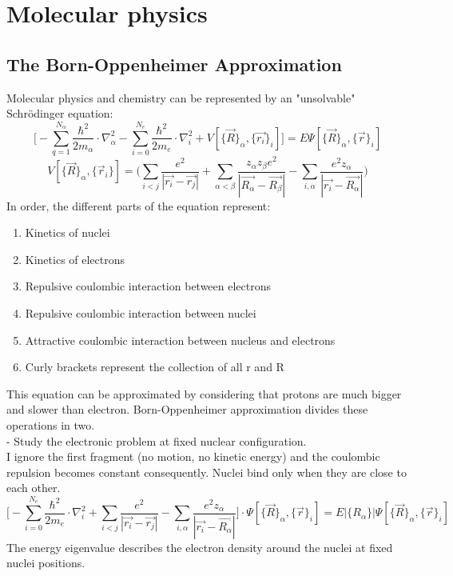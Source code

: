 \graphicspath{{chapters/07/}}
\chapter{Molecular physics}
\section{The Born-Oppenheimer Approximation}
Molecular physics and chemistry can be represented by an "unsolvable" Schr\"odinger equation:\\
\[
\bigg[-\sum_{q=1}^{N_{\alpha}}\frac{\hbar^2}{2m_{\alpha}}\cdot\nabla_{\alpha}^2
-\sum_{i=0}^{N_e}\frac{\hbar^2}{2m_e}\cdot\nabla^2_i
+V[\{\vec{R}\}_{\alpha},\{\vec{r_i}\}_i]\bigg]=E\Psi[\{\vec{R}\}_{\alpha},\{\vec{r}\}_i]
\]
\[
V[\{\vec{R}\}_{\alpha},\{\vec{r}_i\}]=\bigg(\sum_{i<j}\frac{e^2}{|\vec{r_i}-\vec{r_j}|}
+\sum_{\alpha<\beta}\frac{z_{\alpha}z_{\beta}e^2}{|\vec{R_{\alpha}}-\vec{R_{\beta}}|}
-\sum_{i,\alpha}\frac{e^2z_{\alpha}}{|\vec{r_i}-\vec{R_{\alpha}}|}\bigg)\]
In order, the different parts of the equation represent:
\begin{enumerate}
	\item Kinetics of nuclei
	\item Kinetics of electrons
	\item Repulsive coulombic interaction between electrons
	\item Repulsive coulombic interaction between nuclei
	\item Attractive coulombic interaction between nucleus and electrons
	\item Curly brackets represent the collection of all r and R
\end{enumerate}
This equation can be approximated by considering that protons are much bigger and slower than electron. Born-Oppenheimer approximation divides these operations in two.\\
 - Study the electronic problem at fixed nuclear configuration.\\
I ignore the first fragment (no motion, no kinetic energy) and the coulombic repulsion becomes constant consequently. Nuclei bind only when they are close to each other.
\[
\bigg[-\sum_{i=0}^{N_e}\frac{\hbar^2}{2m_e}\cdot\nabla^2_i
+\sum_{i<j}\frac{e^2}{|\vec{r_i}-\vec{r_j}|}
-\sum_{i,\alpha}\frac{e^2z_{\alpha}}{|\vec{r_i}-\vec{R_{\alpha}}|}\bigg]\cdot\Psi[\{\vec{R}\}_{\alpha},\{\vec{r}\}_i] =E|\{R_{\alpha}\}|\Psi[\{\vec{R}\}_{\alpha},\{\vec{r}\}_i]
\]
The energy eigenvalue describes the electron density around the nuclei at fixed nuclei positions.\\

